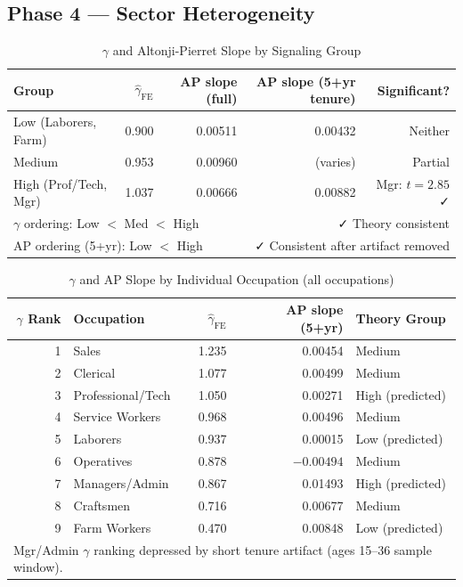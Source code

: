\documentclass[11pt, letterpaper]{article}
\begin{document}
\subsection{Phase 4 --- Sector Heterogeneity}

\begin{table}[h!]
\centering
\caption{$\gamma$ and Altonji-Pierret Slope by Signaling Group}
\label{tab:sector}
\begin{tabular}{lrrrr}
\toprule
Group & $\hat{\gamma}_\text{FE}$ & AP slope (full) & AP slope (5+yr tenure) & Significant? \\
\midrule
Low (Laborers, Farm) & 0.900 & 0.00511 & 0.00432 & Neither \\
Medium & 0.953 & 0.00960 & (varies) & Partial \\
High (Prof/Tech, Mgr) & 1.037 & 0.00666 & 0.00882 & Mgr: $t = 2.85$ ✓ \\
\midrule
\multicolumn{3}{l}{$\gamma$ ordering: Low $<$ Med $<$ High} & \multicolumn{2}{r}{✓ Theory consistent} \\
\multicolumn{3}{l}{AP ordering (5+yr): Low $<$ High} & \multicolumn{2}{r}{✓ Consistent after artifact removed} \\
\bottomrule
\end{tabular}
\end{table}

\begin{table}[h!]
\centering
\caption{$\gamma$ and AP Slope by Individual Occupation (all occupations)}
\label{tab:occ_ranking}
\begin{tabular}{rlrrl}
\toprule
$\gamma$ Rank & Occupation & $\hat{\gamma}_\text{FE}$ & AP slope (5+yr) & Theory Group \\
\midrule
1 & Sales & 1.235 & 0.00454 & Medium \\
2 & Clerical & 1.077 & 0.00499 & Medium \\
3 & Professional/Tech & 1.050 & 0.00271 & High (predicted) \\
4 & Service Workers & 0.968 & 0.00496 & Medium \\
5 & Laborers & 0.937 & 0.00015 & Low (predicted) \\
6 & Operatives & 0.878 & $-0.00494$ & Medium \\
7 & Managers/Admin & 0.867 & 0.01493 & High (predicted) \\
8 & Craftsmen & 0.716 & 0.00677 & Medium \\
9 & Farm Workers & 0.470 & 0.00848 & Low (predicted) \\
\bottomrule
\multicolumn{5}{l}{\footnotesize Mgr/Admin $\gamma$ ranking depressed by short tenure artifact (ages 15--36 sample window).}
\end{tabular}
\end{table}
\end{document}
